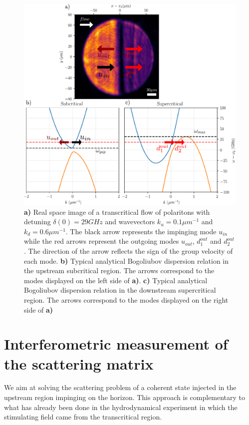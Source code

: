 \begin{figure}[htbp]
    \centering
    \includegraphics[width=1\textwidth]{chap_stimulated_hawking/fig/typical_dens_2D.pdf}
    \caption{\textbf{a)} Real space image of a transcritical flow of polaritons with detuning $\delta(0)=29 GHz$ and wavevectors $k_u=0.1 \mu m^{-1}$ and $k_d=0.6\mu m^{-1}$. The black arrow represents the impinging mode $u_{in}$ while the red arrows represent the outgoing modes $u_{out}$, $d_1^{out}$ and $d_2^{out}$. The direction
    of the arrow reflects the sign of the group velocity of each mode.
    \textbf{b)} Typical analytical Bogoliubov dispersion relation in the upstream subcritical region. The arrows correspond to the modes displayed on the left side of \textbf{a)}. 
    \textbf{c)} Typical analytical Bogoliubov dispersion relation in the downstream supercritical region. The arrows correspond to the modes displayed on the right side of \textbf{a)}}
    \label{fig:typical_dens_2D}
\end{figure}


\section{Interferometric measurement of the scattering matrix }
\label{sec:principle_measurement}

We aim at solving the scattering problem of a coherent state injected in the upstream region impinging on the horizon.
This approach is complementary to what has already been done in the hydrodynamical experiment \cite{euve_scattering_2020} in which
the stimulating field came from the transcritical region.

